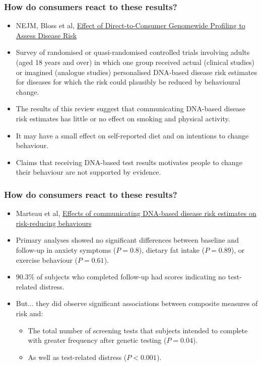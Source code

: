 \documentclass{beamer}
\begin{document}
\begin{frame}
  \frametitle{How do consumers react to these results?}
  \begin{itemize}
  \item NEJM, Bloss et al, \href{http://www.nejm.org/doi/full/10.1056/NEJMoa1011893}{Effect of Direct-to-Consumer Genomewide Profiling to Assess Disease Risk}
    \item Survey of randomised or quasi-randomised controlled trials involving adults (aged 18 years and over) in which one group received actual (clinical studies) or imagined (analogue studies) personalised DNA-based disease risk estimates for diseases for which the risk could plausibly be reduced by behavioural change.
  \item The results of this review suggest that communicating DNA-based disease risk estimates has little or no effect on smoking and physical activity.
  \item It may have a small effect on self-reported diet and on intentions to change behaviour. 
  \item Claims that receiving DNA-based test results motivates people to change their behaviour are not supported by evidence. 
  \end{itemize}
\end{frame}




\begin{frame}
  \frametitle{How do consumers react to these results?}
  \begin{itemize}
  \item Marteau et al, \href{http://onlinelibrary.wiley.com/doi/10.1002/14651858.CD007275.pub2/abstract}{Effects of communicating DNA-based disease risk estimates on risk-reducing behaviours}
  \item Primary analyses showed no significant differences between baseline and follow-up in anxiety symptoms ($P=0.8$), dietary fat intake ($P=0.89$), or exercise behaviour ($P=0.61$). 
  \item 90.3\% of subjects who completed follow-up had scores indicating no test-related distress. 
  \item But... they did observe significant associations between composite measures of risk and:
    \begin{itemize}
    \item The total number of screening tests that subjects intended to complete with greater frequency after genetic testing ($P = 0.04$).
    \item As well as test-related distress ($P < 0.001$).
    \end{itemize}
  \end{itemize}
\end{frame}
\end{document}
